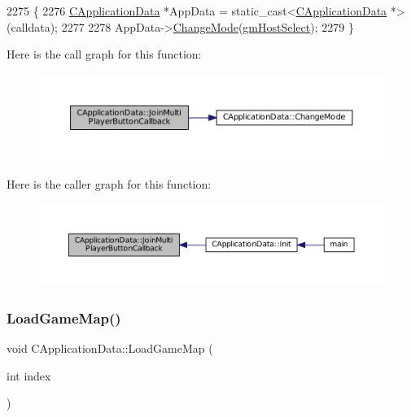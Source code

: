 \begin{DoxyCode}
2275                                                                   \{
2276     \hyperlink{classCApplicationData}{CApplicationData} *AppData = \textcolor{keyword}{static\_cast<}\hyperlink{classCApplicationData}{CApplicationData} *\textcolor{keyword}{>}(calldata);
2277  
2278     AppData->\hyperlink{classCApplicationData_aee18c113e9a0acb3cad3d63eb19de71b}{ChangeMode}(\hyperlink{classCApplicationData_ac8ac37a4c8bb871036fbbdc6a072e403a52495c9194d08aa240ec79eb1e3e0d41}{gmHostSelect});
2279 \}
\end{DoxyCode}
Here is the call graph for this function\+:\nopagebreak
\begin{figure}[H]
\begin{center}
\leavevmode
\includegraphics[width=350pt]{classCApplicationData_a4fa8cf7a67c0ae980d38e1fe7b967f41_cgraph}
\end{center}
\end{figure}
Here is the caller graph for this function\+:\nopagebreak
\begin{figure}[H]
\begin{center}
\leavevmode
\includegraphics[width=350pt]{classCApplicationData_a4fa8cf7a67c0ae980d38e1fe7b967f41_icgraph}
\end{center}
\end{figure}
\hypertarget{classCApplicationData_a89af0c7917be766575720e5ac79c8d2d}{}\label{classCApplicationData_a89af0c7917be766575720e5ac79c8d2d} 
\subsubsection{\texorpdfstring{Load\+Game\+Map()}{LoadGameMap()}}
{\footnotesize\ttfamily void C\+Application\+Data\+::\+Load\+Game\+Map (\begin{DoxyParamCaption}\item[{int}]{index }\end{DoxyParamCaption})\hspace{0.3cm}{\ttfamily [protected]}}



